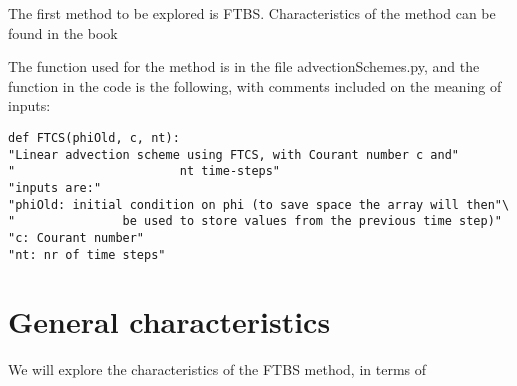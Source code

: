 


The first method to be explored is FTBS. Characteristics of the method can be found in the book 

The function used for the method is in the file advectionSchemes.py, and the function in the code is the following, with comments included on the meaning of inputs:
\begin{lstlisting}
def FTCS(phiOld, c, nt):    
"Linear advection scheme using FTCS, with Courant number c and"
"                       nt time-steps"
"inputs are:"
"phiOld: initial condition on phi (to save space the array will then"\
"               be used to store values from the previous time step)"
"c: Courant number"
"nt: nr of time steps"
\end{lstlisting}

\section{General characteristics}
We will explore the characteristics of the FTBS method, in terms of 



